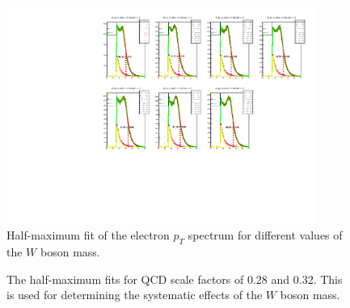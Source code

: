 \documentclass[a4paper]{report}
\numberwithin{equation}{section}
\begin{document}
\begin{figure}[htpb]
    \centering
    \includegraphics[width=0.9\textwidth]{hw_plots.pdf}
    \caption{Half-maximum fit of the electron $p_T$ spectrum for different values of the $W$ boson mass.}
    \label{fig:hm_allmass}
\end{figure}

\begin{figure}[htb!]
	\centering
	\quad
	\centering
	\caption{The half-maximum fits for QCD scale factors of 0.28 and 0.32. This is used for determining the systematic 
    effects of the $W$ boson mass.}
	\label{fig:hm_qcd}
\end{figure}
\end{document}
